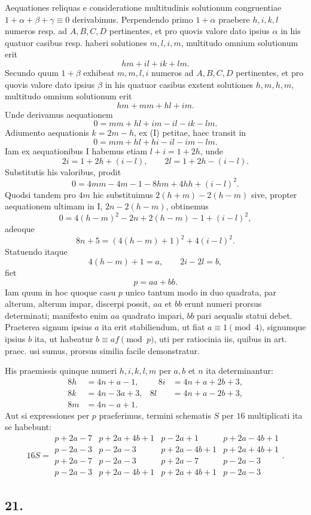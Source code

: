 \documentclass[12pt]{article}
\begin{document}
Aequationes reliquas e consideratione multitudinis solutionum congruentiae $1+\alpha+\beta+\gamma\equiv0$ derivabimus. Perpendendo primo $1+\alpha$ praebere $h,i,k,l$ numeros resp. ad $A,B,C,D$ pertinentes, et pro quovis valore dato ipsius $\alpha$ in his quatuor casibus resp. haberi solutiones $m,l,i,m$, multitudo omnium solutionum erit
\[
hm+il+ik+lm.
\]
Secundo quum $1+\beta$ exhibeat $m,m,l,i$ numeros ad $A,B,C,D$ pertinentes, et pro quovis valore dato ipsius $\beta$ in his quatuor casibus exstent solutiones $h,m,h,m$, multitudo omnium solutionum erit
\[
hm+mm+hl+im.
\]
Unde derivamus aequationem
\[
0=mm+hl+im-il-ik-lm.
\]
Adiumento aequationis $k=2m-h$, ex (I) petitae, haec transit in
\[
0=mm+hl+hi-il-im-lm.
\]
Iam ex aequationibus I habemus etiam $l+i=1+2h$, unde
\[
2i=1+2h+(i-l),\qquad 2l=1+2h-(i-l).
\]
Substitutis his valoribus, prodit
\[
0=4mm-4m-1-8hm+4hh+(i-l)^2.
\]
Quodsi tandem pro $4m$ hic substituimus $2(h+m)-2(h-m)$ sive, propter aequationem ultimam in I, $2n-2(h-m)$, obtinemus
\[
0=4(h-m)^2-2n+2(h-m)-1+(i-l)^2,
\]
adeoque
\[
8n+5=(4(h-m)+1)^2+4(i-l)^2.
\]
Statuendo itaque
\[
4(h-m)+1=a,\qquad 2i-2l=b,
\]
fiet
\[
p=aa+bb.
\]
Iam quum in hoc quoque casu $p$ unico tantum modo in duo quadrata, par alterum, alterum impar, discerpi possit, $aa$ et $bb$ erunt numeri prorsus determinati; manifesto enim $aa$ quadrato impari, $bb$ pari aequalis statui debet. Praeterea signum ipsius $a$ ita erit stabiliendum, ut fiat $a\equiv1\pmod4$, signumque ipsius $b$ ita, ut habeatur $b\equiv af\pmod p$, uti per ratiocinia iis, quibus in art. praec. usi sumus, prorsus similia facile demonstratur.

His praemissis quinque numeri $h,i,k,l,m$ per $a,b$ et $n$ ita determinantur:
\[
\begin{aligned}
8h&=4n+a-1,&\quad 8i&=4n+a+2b+3,\\
8k&=4n-3a+3,& 8l&=4n+a-2b+3,\\
8m&=4n-a+1.
\end{aligned}
\]
Aut si expressiones per $p$ praeferimus, termini schematis $S$ per $16$ multiplicati ita se habebunt:
\[
16S=\begin{array}{rrrr}
p+2a-7&p+2a+4b+1&p-2a+1&p+2a-4b+1\\
p-2a-3&p-2a-3&p+2a-4b+1&p+2a+4b+1\\
p+2a-7&p-2a-3&p+2a-7&p-2a-3\\
p-2a-3&p+2a-4b+1&p+2a+4b+1&p-2a-3
\end{array}.
\]

\subsection*{21.}
\end{document}
